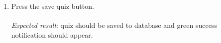 \begin{enumerate}[leftmargin=*]
\item Press the save quiz button.\\\\
\textit{Expected result}: quiz should be saved to database and green success notification should appear.
\end{enumerate}
